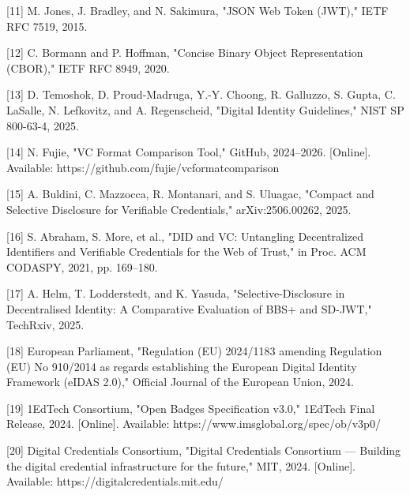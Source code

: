 {[}11{]} M. Jones, J. Bradley, and N. Sakimura, "JSON Web Token (JWT)," IETF RFC 7519, 2015.

{[}12{]} C. Bormann and P. Hoffman, "Concise Binary Object Representation (CBOR)," IETF RFC 8949, 2020.

{[}13{]} D. Temoshok, D. Proud-Madruga, Y.-Y. Choong, R. Galluzzo, S. Gupta, C. LaSalle, N. Lefkovitz, and A. Regenscheid, "Digital Identity Guidelines," NIST SP 800-63-4, 2025.

{[}14{]} N. Fujie, "VC Format Comparison Tool," GitHub, 2024--2026. {[}Online{]}. Available: https://github.com/fujie/vcformatcomparison

{[}15{]} A. Buldini, C. Mazzocca, R. Montanari, and S. Uluagac, "Compact and Selective Disclosure for Verifiable Credentials," arXiv:2506.00262, 2025.

{[}16{]} S. Abraham, S. More, et al., "DID and VC: Untangling Decentralized Identifiers and Verifiable Credentials for the Web of Trust," in Proc. ACM CODASPY, 2021, pp. 169--180.

{[}17{]} A. Helm, T. Lodderstedt, and K. Yasuda, "Selective-Disclosure in Decentralised Identity: A Comparative Evaluation of BBS+ and SD-JWT," TechRxiv, 2025.

{[}18{]} European Parliament, "Regulation (EU) 2024/1183 amending Regulation (EU) No 910/2014 as regards establishing the European Digital Identity Framework (eIDAS 2.0)," Official Journal of the European Union, 2024.

{[}19{]} 1EdTech Consortium, "Open Badges Specification v3.0," 1EdTech Final Release, 2024. {[}Online{]}. Available: https://www.imsglobal.org/spec/ob/v3p0/

{[}20{]} Digital Credentials Consortium, "Digital Credentials Consortium --- Building the digital credential infrastructure for the future," MIT, 2024. {[}Online{]}. Available: https://digitalcredentials.mit.edu/
